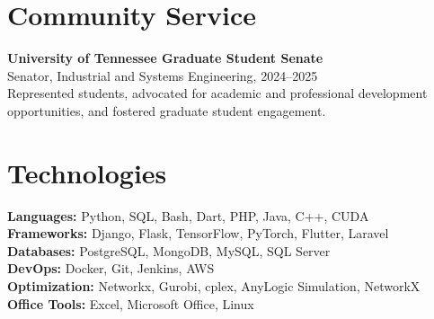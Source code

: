 \documentclass[10pt, letterpaper]{article}
\begin{document}
\section*{Community Service}

\textbf{University of Tennessee Graduate Student Senate} \\  
Senator, Industrial and Systems Engineering, 2024–2025 \\  
\small
Represented students, advocated for academic and professional development opportunities, and fostered graduate student engagement.







\section*{Technologies}
\begin{multicols}{2}
    \textbf{Languages:} Python, SQL, Bash, Dart, PHP, Java, C++, CUDA \\
    \textbf{Frameworks:} Django, Flask, TensorFlow, PyTorch, Flutter, Laravel \\
    \textbf{Databases:} PostgreSQL, MongoDB, MySQL, SQL Server \\
    \textbf{DevOps:} Docker, Git, Jenkins, AWS \\
    \textbf{Optimization:} Networkx, Gurobi, cplex, AnyLogic Simulation, NetworkX \\
    \textbf{Office Tools:} Excel, Microsoft Office, Linux
\end{multicols}

    
\end{document}
